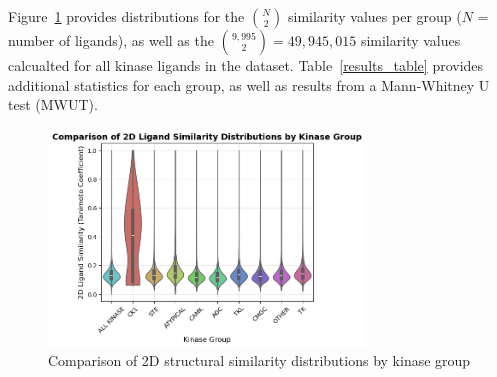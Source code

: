 \documentclass[11pt]{article}
\begin{document}
Figure~\ref{violin_plot} provides distributions for the ${N\choose 2}$ similarity values per group ($N$ = number of ligands), as well as the ${9,995 \choose 2} = 49,945,015$ similarity values calcualted for all kinase ligands in the dataset. Table~\ref{results_table} provides additional statistics for each group, as well as results from a Mann-Whitney U test (MWUT).
\begin{figure}[H]
    \centering
    \includegraphics[width=0.75\textwidth]{../figures/violin_plot.png}
    \caption{Comparison of 2D structural similarity distributions by kinase group}
    \label{violin_plot}
\end{figure}

\begin{table}[!ht]
\centering
{}
\caption{Table showing comparisons of targets, ligands, and ligand similarity distributions per kinase group. Shown p-values are calculated (with Bonferroni correction) from a MWUT where the alternative hypothesis is that the similarity values within the group are stochastically greater than the distribution of all similarity values.}\label{results_table}
\end{table}
\end{document}
